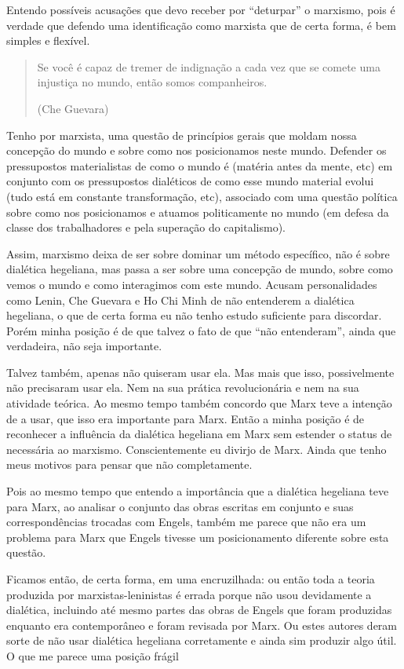 Entendo possíveis acusações que devo receber por “deturpar” o marxismo, pois é verdade que defendo uma identificação como marxista que de certa forma, é bem simples e flexível. 

\begin{quote}
Se você é capaz de tremer de indignação a cada vez que se comete uma injustiça no mundo, então somos companheiros.

(Che Guevara)
\end{quote}

Tenho por marxista, uma questão de princípios gerais que moldam nossa concepção do mundo e sobre como nos posicionamos neste mundo. Defender os pressupostos materialistas de como o mundo é (matéria antes da mente, etc) em conjunto com os pressupostos dialéticos de como esse mundo material evolui (tudo está em constante transformação, etc), associado com uma questão política sobre como nos posicionamos e atuamos politicamente no mundo (em defesa da classe dos trabalhadores e pela superação do capitalismo).

Assim, marxismo deixa de ser sobre dominar um método específico, não é sobre dialética hegeliana, mas passa a ser sobre uma concepção de mundo, sobre como vemos o mundo e como interagimos com este mundo. Acusam personalidades como Lenin, Che Guevara e Ho Chi Minh de não entenderem a dialética hegeliana, o que de certa forma eu não tenho estudo suficiente para discordar. Porém minha posição é de que talvez o fato de que “não entenderam”, ainda que verdadeira, não seja importante.

Talvez também, apenas não quiseram usar ela. Mas mais que isso, possivelmente não precisaram usar ela. Nem na sua prática revolucionária e nem na sua atividade teórica. Ao mesmo tempo também concordo que Marx teve a intenção de a usar, que isso era importante para Marx. Então a minha posição é de reconhecer a influência da dialética hegeliana em Marx sem estender o status de necessária ao marxismo. Conscientemente eu divirjo de Marx. Ainda que tenho meus motivos para pensar que não completamente.

Pois ao mesmo tempo que entendo a importância que a dialética hegeliana teve para Marx, ao analisar o conjunto das obras escritas em conjunto e suas correspondências trocadas com Engels, também me parece que não era um problema para Marx que Engels tivesse um posicionamento diferente sobre esta questão.

Ficamos então, de certa forma, em uma encruzilhada: ou então toda a teoria produzida por marxistas-leninistas é errada porque não usou devidamente a dialética, incluindo até mesmo partes das obras de Engels que foram produzidas enquanto era contemporâneo e foram revisada por Marx. Ou estes autores deram sorte de não usar dialética hegeliana corretamente e ainda sim produzir algo útil. O que me parece uma posição frágil


